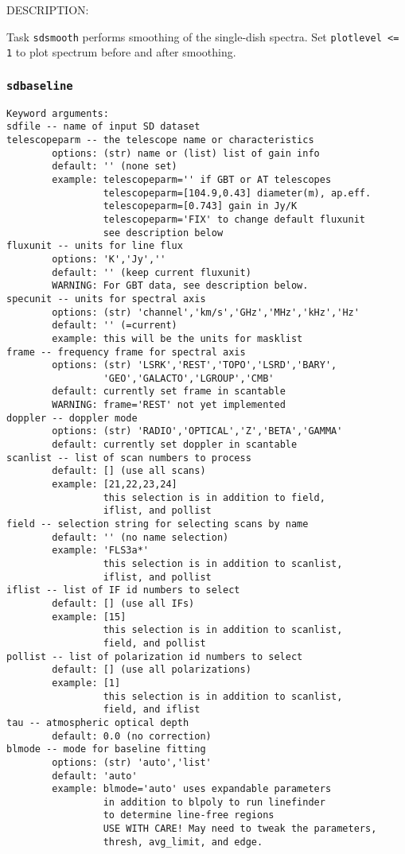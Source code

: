     DESCRIPTION:

    Task {\tt sdsmooth} performs smoothing of the single-dish spectra.
    Set {\tt plotlevel <= 1} to plot spectrum before and after smoothing.

    
\subsubsection{{\tt sdbaseline}}
\label{section:sd.sdtasks.tasks.sdbaseline}

\begin{verbatim}
Keyword arguments:
sdfile -- name of input SD dataset
telescopeparm -- the telescope name or characteristics
        options: (str) name or (list) list of gain info
        default: '' (none set)
        example: telescopeparm='' if GBT or AT telescopes
                 telescopeparm=[104.9,0.43] diameter(m), ap.eff.
                 telescopeparm=[0.743] gain in Jy/K
                 telescopeparm='FIX' to change default fluxunit
                 see description below
fluxunit -- units for line flux
        options: 'K','Jy',''
        default: '' (keep current fluxunit)
        WARNING: For GBT data, see description below.
specunit -- units for spectral axis
        options: (str) 'channel','km/s','GHz','MHz','kHz','Hz'
        default: '' (=current)
        example: this will be the units for masklist
frame -- frequency frame for spectral axis
        options: (str) 'LSRK','REST','TOPO','LSRD','BARY',
                 'GEO','GALACTO','LGROUP','CMB'
        default: currently set frame in scantable
        WARNING: frame='REST' not yet implemented
doppler -- doppler mode
        options: (str) 'RADIO','OPTICAL','Z','BETA','GAMMA'
        default: currently set doppler in scantable
scanlist -- list of scan numbers to process
        default: [] (use all scans)
        example: [21,22,23,24]
                 this selection is in addition to field,
                 iflist, and pollist
field -- selection string for selecting scans by name
        default: '' (no name selection)
        example: 'FLS3a*'
                 this selection is in addition to scanlist,
                 iflist, and pollist
iflist -- list of IF id numbers to select
        default: [] (use all IFs)
        example: [15]
                 this selection is in addition to scanlist,
                 field, and pollist
pollist -- list of polarization id numbers to select
        default: [] (use all polarizations)
        example: [1]
                 this selection is in addition to scanlist,
                 field, and iflist
tau -- atmospheric optical depth
        default: 0.0 (no correction)
blmode -- mode for baseline fitting
        options: (str) 'auto','list'
        default: 'auto'
        example: blmode='auto' uses expandable parameters
                 in addition to blpoly to run linefinder
                 to determine line-free regions
                 USE WITH CARE! May need to tweak the parameters,
                 thresh, avg_limit, and edge.


\end{verbatim}
